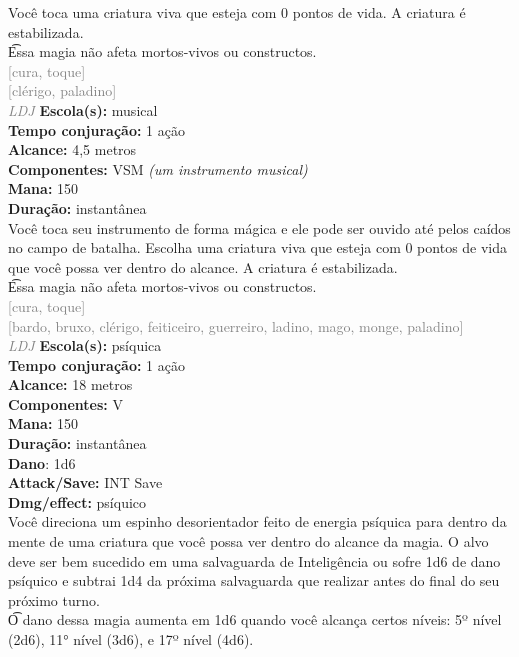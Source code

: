\documentclass{RPG_Adventure}[2021/10/20]
\begin{document}
{\normalsize Você toca uma criatura viva que esteja com 0 pontos de vida. A criatura é estabilizada.\\\t Essa magia não afeta mortos-vivos ou constructos.\\}
{\scriptsize \textcolor{gray}{[cura, toque]\\}}
{\scriptsize \textcolor{gray}{[clérigo, paladino]\\}}
{\tiny \textcolor{gray}{\textit{LDJ}}}
{\small \t \textbf{Escola(s):} musical\\\t \textbf{Tempo conjuração:} 1 ação\\\t \textbf{Alcance:} 4,5 metros\\\t \textbf{Componentes:} VSM \textit{(um instrumento musical)}\\\t \textbf{Mana:} 150\\\t \textbf{Duração:} instantânea\\}
{\normalsize Você toca seu instrumento de forma mágica e ele pode ser ouvido até pelos caídos no campo de batalha. Escolha uma criatura viva que esteja com 0 pontos de vida que você possa ver dentro do alcance. A criatura é estabilizada.\\\t Essa magia não afeta mortos-vivos ou constructos.\\}
{\scriptsize \textcolor{gray}{[cura, toque]\\}}
{\scriptsize \textcolor{gray}{[bardo, bruxo, clérigo, feiticeiro, guerreiro, ladino, mago, monge, paladino]\\}}
{\tiny \textcolor{gray}{\textit{LDJ}}}
{\small \t \textbf{Escola(s):} psíquica\\\t \textbf{Tempo conjuração:} 1 ação\\\t \textbf{Alcance:} 18 metros\\\t \textbf{Componentes:} V\\\t \textbf{Mana:} 150\\\t \textbf{Duração:} instantânea\\\t \textbf{Dano}: 1d6\\\t \textbf{Attack/Save:} INT Save\\\t \textbf{Dmg/effect:} psíquico\\}
{\normalsize Você direciona um espinho desorientador feito de energia psíquica para dentro da mente de uma criatura que você possa ver dentro do alcance da magia. O alvo deve ser bem sucedido em uma salvaguarda de Inteligência ou sofre 1d6 de dano psíquico e subtrai 1d4 da próxima salvaguarda que realizar antes do final do seu próximo turno.\\\t O dano dessa magia aumenta em 1d6 quando você alcança certos níveis: 5º nível (2d6), 11° nível (3d6), e 17º nível (4d6).\\}
\end{document}

